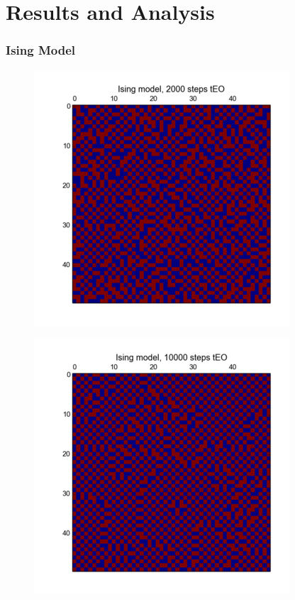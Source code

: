 \documentclass[12pt]{article}
\begin{document}


\section{Results and Analysis}
  
  \frametitle{Ising Model}
  \begin{figure}
    \includegraphics{2000}
  \end{figure}
  \begin{figure}
    \includegraphics{10000}
  \end{figure}
  
\end{document}

